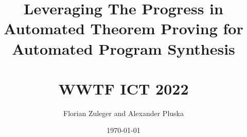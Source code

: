 \documentclass[a4paper,12pt]{article}
\begin{document}
\title{Leveraging The Progress in Automated Theorem Proving for Automated Program Synthesis\\\\
\small{WWTF ICT 2022}}
\author{Florian Zuleger and Alexander Pluska}
\date{\today}
\maketitle

\begin{abstract}


\end{abstract}
\end{document}
